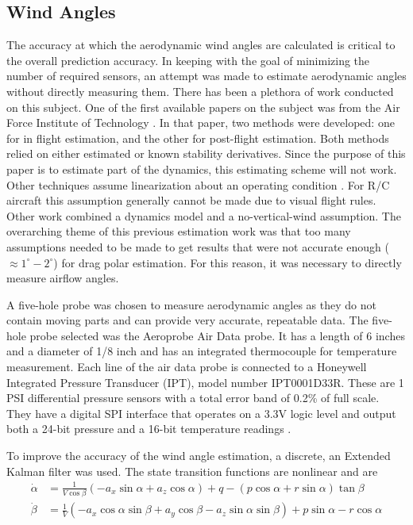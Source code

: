 \documentclass[]{aiaa-tc}%
\begin{document}
\subsection*{Wind Angles}
The accuracy at which the aerodynamic wind angles are calculated is critical to the overall prediction accuracy. In keeping with the goal of minimizing the number of required sensors, an attempt was made to estimate aerodynamic angles without directly measuring them. There has been a plethora of work conducted on this subject. One of the first available papers on the subject was from the Air Force Institute of Technology \cite{joseph1988}. In that paper, two methods were developed: one for in flight estimation, and the other for post-flight estimation. Both methods relied on either estimated or known stability derivatives. Since the purpose of this paper is to estimate part of the dynamics, this estimating scheme will not work. Other techniques assume linearization about an operating condition \cite{morelli2012real}. For R/C aircraft this assumption generally cannot be made due to visual flight rules. Other work \cite{Lie2013} combined a dynamics model and a no-vertical-wind assumption. The overarching theme of this previous estimation work was that too many assumptions needed to be made to get results that were not accurate enough ($\approx1^\circ-2^\circ$) for drag polar estimation. For this reason, it was necessary to directly measure airflow angles.

A five-hole probe was chosen to measure aerodynamic angles as they do not contain moving parts and can provide very accurate, repeatable data. The five-hole probe selected was the Aeroprobe Air Data probe. It has a length of 6 inches and a diameter of 1/8 inch and has an integrated thermocouple for temperature measurement. Each line of the air data probe is connected to a Honeywell Integrated Pressure Transducer (IPT), model number IPT0001D33R. These are 1 PSI differential pressure sensors with a total error band of 0.2\% of full scale. They have a digital SPI interface that operates on a 3.3V logic level and output both a 24-bit pressure and a 16-bit temperature readings \cite{HoneywellIPTDataSheet}.

\indent

To improve the accuracy of the wind angle estimation, a discrete, an Extended Kalman filter was used. The state transition functions are nonlinear and are
\begin{align}
\dot{\alpha} & = \frac{1}{V\cos\beta}(-a_x\sin\alpha+a_z\cos\alpha)+q-(p\cos\alpha+r\sin\alpha)\tan\beta\\
\dot{\beta} &=\frac{1}{V}(-a_x\cos\alpha\sin\beta+a_y\cos\beta-a_z\sin\alpha\sin\beta)+p\sin\alpha-r\cos\alpha
\end{align}
\end{document}
